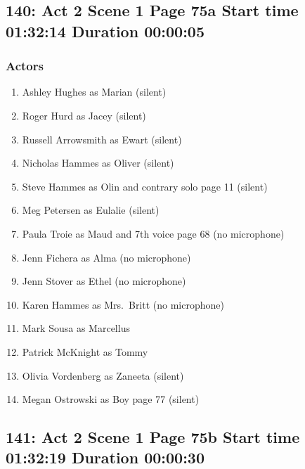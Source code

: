 \subsection{140: Act 2 Scene 1 Page 75a Start time 01:32:14 Duration 00:00:05}

\subsubsection{Actors}
\begin{enumerate}
\item Ashley Hughes as Marian (silent)
\item Roger Hurd as Jacey (silent)
\item Russell Arrowsmith as Ewart (silent)
\item Nicholas Hammes as Oliver (silent)
\item Steve Hammes as Olin and contrary solo page 11 (silent)
\item Meg Petersen as Eulalie (silent)
\item Paula Troie as Maud and 7th voice page 68 (no microphone)
\item Jenn Fichera as Alma (no microphone)
\item Jenn Stover as Ethel (no microphone)
\item Karen Hammes as Mrs.~Britt (no microphone)
\item Mark Sousa as Marcellus
\item Patrick McKnight as Tommy
\item Olivia Vordenberg as Zaneeta (silent)
\item Megan Ostrowski as Boy page 77 (silent)
\end{enumerate}


\subsection{141: Act 2 Scene 1 Page 75b Start time 01:32:19 Duration 00:00:30}

